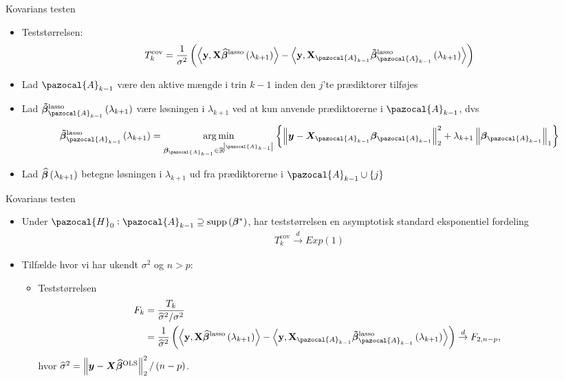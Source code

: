 \begin{frame}{Kovarians testen}
\begin{itemize}
\item Teststørrelsen:
 \begin{align*}
T_k^{\text{cov}} = \frac{1}{\sigma^2}\del{ \left\langle \textbf{y}, \textbf{X} \widehat{\boldsymbol{\beta}}^\text{lasso} \del{\lambda_{k+1}} \right\rangle -  \left\langle  \textbf{y}, \textbf{X}_{\pazocal{A}_{k-1}} \boldsymbol{\tilde{\beta}}^\text{lasso}_{\pazocal{A}_{k-1}} \del{\lambda_{k+1}} \right\rangle}
\end{align*}
\item Lad $\pazocal{A}_{k-1}$ være den aktive mængde i trin $k-1$ inden den $j$'te prædiktorer tilføjes
\item  Lad $\boldsymbol{\tilde{\beta}}^{\text{lasso}}_{\pazocal{A}_{k-1}} \del{\lambda_{k+1}}$ være løsningen i $\lambda_{k+1}$ ved at kun anvende prædiktorerne i $\pazocal{A}_{k-1}$, dvs 
\begin{align*}
\boldsymbol{\tilde{\beta}}^{\text{lasso}}_{\pazocal{A}_{k-1}} \del{\lambda_{k+1}} = 
\underset{\boldsymbol{\beta}_{\pazocal{A}_{k-1}} \in \mathbb{R}^{\abs{\pazocal{A}_{k-1}}} }{\arg\min} \cbr{\left\Vert \vy - \vX_{\pazocal{A}_{k-1}} \boldsymbol\beta_{\pazocal{A}_{k-1}} \right\Vert^2_2 + \lambda_{k+1} \left\Vert \boldsymbol\beta_{\pazocal{A}_{k-1}}  \right\Vert_1}
\end{align*}
\item  Lad $\boldsymbol{\widehat{\beta}} \del{\lambda_{k+1}}$ betegne løsningen i $\lambda_{k+1}$ ud fra prædiktorerne i   $\pazocal{A}_{k-1} \cup \cbr{j}$
\end{itemize}
\end{frame}

\begin{frame}{Kovarians testen}
\begin{itemize}
\item Under $\pazocal{H}_0 : \pazocal{A}_{k-1} \supseteq \text{supp} \del{\boldsymbol\beta^*} $, har teststørrelsen en asymptotisk standard eksponentiel fordeling 
\begin{align*}
T_k^{\text{cov}} \overset{d}{\rightarrow} Exp(1)
\end{align*}
\item Tilfælde hvor vi har ukendt $\sigma^2$ og $n>p$: 
\begin{itemize}
\item Teststørrelsen
\begin{align*}
F_k & = \frac{T_k}{\widehat\sigma^2 /\sigma^2} \\
& = \frac{1}{\widehat\sigma^2}\del{ \left\langle \textbf{y}, \textbf{X} \widehat{\boldsymbol{\beta}}^\text{lasso} \del{\lambda_{k+1}} \right\rangle -  \left\langle  \textbf{y}, \textbf{X}_{\pazocal{A}_{k-1}} \boldsymbol{\tilde{\beta}}^\text{lasso}_{\pazocal{A}_{k-1}} \del{\lambda_{k+1}} \right\rangle} \overset{d}{\rightarrow} F_{2,n-p},
\end{align*}
hvor $\widehat{\sigma}^2 = \left\Vert \vy - \vX \boldsymbol{\widehat{\beta}}^\text{OLS} \right\Vert^2_2  / \del{n-p}$.
\end{itemize}
\end{itemize}
\end{frame}

